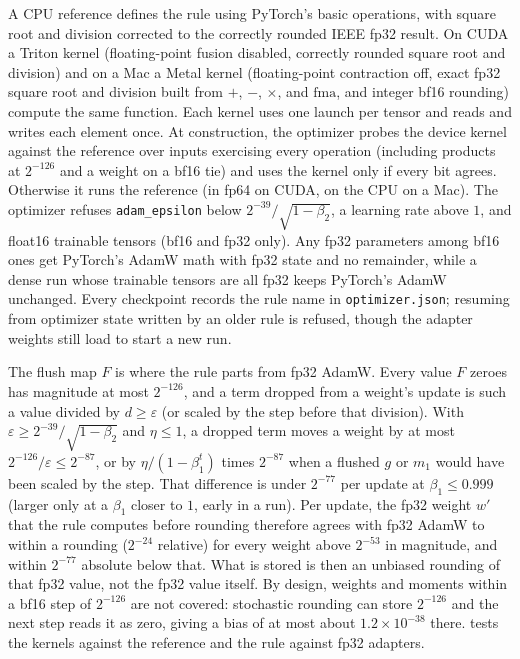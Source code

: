 \documentclass[11pt,letterpaper]{article}
\theoremstyle{definition}
\theoremstyle{plain}
\newcommand{\code}[1]{\texttt{\small #1}}
\begin{document}
A CPU reference defines the rule using PyTorch's basic operations, with square root and division corrected to the correctly rounded IEEE fp32 result.
On CUDA a Triton kernel (floating-point fusion disabled, correctly rounded square root and division) and on a Mac a Metal kernel (floating-point contraction off, exact fp32 square root and division built from $+$, $-$, $\times$, and $\mathrm{fma}$, and integer bf16 rounding) compute the same function.
Each kernel uses one launch per tensor and reads and writes each element once.
At construction, the optimizer probes the device kernel against the reference over inputs exercising every operation (including products at $2^{-126}$ and a weight on a bf16 tie) and uses the kernel only if every bit agrees.
Otherwise it runs the reference (in fp64 on CUDA, on the CPU on a Mac).
The optimizer refuses \code{adam\_epsilon} below $2^{-39}/\sqrt{1-\beta_2}$, a learning rate above $1$, and float16 trainable tensors (bf16 and fp32 only).
Any fp32 parameters among bf16 ones get PyTorch's AdamW math with fp32 state and no remainder, while a dense run whose trainable tensors are all fp32 keeps PyTorch's AdamW unchanged.
Every checkpoint records the rule name in \code{optimizer.json}; resuming from optimizer state written by an older rule is refused, though the adapter weights still load to start a new run.

The flush map $F$ is where the rule parts from fp32 AdamW.
Every value $F$ zeroes has magnitude at most $2^{-126}$, and a term dropped from a weight's update is such a value divided by $d \ge \varepsilon$ (or scaled by the step before that division).
With $\varepsilon \ge 2^{-39}/\sqrt{1-\beta_2}$ and $\eta \le 1$, a dropped term moves a weight by at most $2^{-126}/\varepsilon \le 2^{-87}$, or by $\eta/(1-\beta_1^t)$ times $2^{-87}$ when a flushed $g$ or $m_1$ would have been scaled by the step.
That difference is under $2^{-77}$ per update at $\beta_1 \le 0.999$ (larger only at a $\beta_1$ closer to $1$, early in a run).
Per update, the fp32 weight $w'$ that the rule computes before rounding therefore agrees with fp32 AdamW to within a rounding ($2^{-24}$ relative) for every weight above $2^{-53}$ in magnitude, and within $2^{-77}$ absolute below that.
What is stored is then an unbiased rounding of that fp32 value, not the fp32 value itself.
By design, weights and moments within a bf16 step of $2^{-126}$ are not covered: stochastic rounding can store $2^{-126}$ and the next step reads it as zero, giving a bias of at most about $1.2 \times 10^{-38}$ there.
 tests the kernels against the reference and the rule against fp32 adapters.
\end{document}
